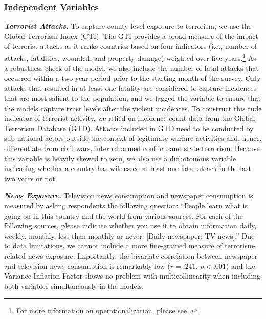 \subsubsection{Independent Variables}
\textbf{\textit{Terrorist Attacks.}} To capture county-level exposure to terrorism, we use the Global Terrorism Index (GTI). The GTI provides a broad measure of the impact of terrorist attacks as it ranks countries based on four indicators (i.e., number of attacks, fatalities, wounded, and property damage) weighted over five years.\footnote{For more information on operationalization, please see \cite{TheInstituteforEconomicsandPeace2016}.} As a robustness check of the model, we also include the number of fatal attacks that occurred within a two-year period prior to the starting month of the survey. Only attacks that resulted in at least one fatality are considered to capture incidences that are most salient to the population, and we lagged the variable to ensure that the models capture trust levels after the violent incidences. To construct this rude indicator of terrorist activity, we relied on incidence count data from the Global Terrorism Database (GTD). Attacks included in GTD need to be conducted by sub-national actors outside the context of legitimate warfare activities and, hence, differentiate from civil wars, internal armed conflict, and state terrorism. Because this variable is heavily skewed to zero, we also use a dichotomous variable indicating whether a country has witnessed at least one fatal attack in the last two years or not.


\vspace{3mm}
\noindent\textbf{\textit{News Exposure.}} Television news consumption and newspaper consumption is measured by asking respondents the following question: ``People learn what is going on in this country and the world from various sources. For each of the following sources, please indicate whether you use it to obtain information daily, weekly, monthly, less than monthly or never: [Daily newspaper; TV news].'' Due to data limitations, we cannot include a more fine-grained measure of terrorism-related news exposure. Importantly, the bivariate correlation between newspaper and television news consumption is remarkably low ($r = .241$, $p < .001$) and the Variance Inflation Factor shows no problem with multicollinearity when including both variables simultaneously in the models.


